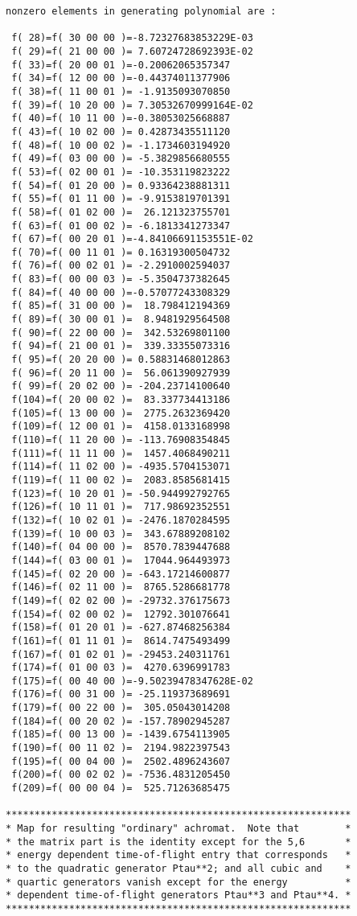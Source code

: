 \begin{footnotesize}
\begin{verbatim}
nonzero elements in generating polynomial are :

 f( 28)=f( 30 00 00 )=-8.72327683853229E-03
 f( 29)=f( 21 00 00 )= 7.60724728692393E-02
 f( 33)=f( 20 00 01 )=-0.20062065357347
 f( 34)=f( 12 00 00 )=-0.44374011377906
 f( 38)=f( 11 00 01 )= -1.9135093070850
 f( 39)=f( 10 20 00 )= 7.30532670999164E-02
 f( 40)=f( 10 11 00 )=-0.38053025668887
 f( 43)=f( 10 02 00 )= 0.42873435511120
 f( 48)=f( 10 00 02 )= -1.1734603194920
 f( 49)=f( 03 00 00 )= -5.3829856680555
 f( 53)=f( 02 00 01 )= -10.353119823222
 f( 54)=f( 01 20 00 )= 0.93364238881311
 f( 55)=f( 01 11 00 )= -9.9153819701391
 f( 58)=f( 01 02 00 )=  26.121323755701
 f( 63)=f( 01 00 02 )= -6.1813341273347
 f( 67)=f( 00 20 01 )=-4.84106691153551E-02
 f( 70)=f( 00 11 01 )= 0.16319300504732
 f( 76)=f( 00 02 01 )= -2.2910002594037
 f( 83)=f( 00 00 03 )= -5.3504737382645
 f( 84)=f( 40 00 00 )=-0.57077243308329
 f( 85)=f( 31 00 00 )=  18.798412194369
 f( 89)=f( 30 00 01 )=  8.9481929564508
 f( 90)=f( 22 00 00 )=  342.53269801100
 f( 94)=f( 21 00 01 )=  339.33355073316
 f( 95)=f( 20 20 00 )= 0.58831468012863
 f( 96)=f( 20 11 00 )=  56.061390927939
 f( 99)=f( 20 02 00 )= -204.23714100640
 f(104)=f( 20 00 02 )=  83.337734413186
 f(105)=f( 13 00 00 )=  2775.2632369420
 f(109)=f( 12 00 01 )=  4158.0133168998
 f(110)=f( 11 20 00 )= -113.76908354845
 f(111)=f( 11 11 00 )=  1457.4068490211
 f(114)=f( 11 02 00 )= -4935.5704153071
 f(119)=f( 11 00 02 )=  2083.8585681415
 f(123)=f( 10 20 01 )= -50.944992792765
 f(126)=f( 10 11 01 )=  717.98692352551
 f(132)=f( 10 02 01 )= -2476.1870284595
 f(139)=f( 10 00 03 )=  343.67889208102
 f(140)=f( 04 00 00 )=  8570.7839447688
 f(144)=f( 03 00 01 )=  17044.964493973
 f(145)=f( 02 20 00 )= -643.17214600877
 f(146)=f( 02 11 00 )=  8765.5286681778
 f(149)=f( 02 02 00 )= -29732.376175673
 f(154)=f( 02 00 02 )=  12792.301076641
 f(158)=f( 01 20 01 )= -627.87468256384
 f(161)=f( 01 11 01 )=  8614.7475493499
 f(167)=f( 01 02 01 )= -29453.240311761
 f(174)=f( 01 00 03 )=  4270.6396991783
 f(175)=f( 00 40 00 )=-9.50239478347628E-02
 f(176)=f( 00 31 00 )= -25.119373689691
 f(179)=f( 00 22 00 )=  305.05043014208
 f(184)=f( 00 20 02 )= -157.78902945287
 f(185)=f( 00 13 00 )= -1439.6754113905
 f(190)=f( 00 11 02 )=  2194.9822397543
 f(195)=f( 00 04 00 )=  2502.4896243607
 f(200)=f( 00 02 02 )= -7536.4831205450
 f(209)=f( 00 00 04 )=  525.71263685475

************************************************************
* Map for resulting "ordinary" achromat.  Note that        *
* the matrix part is the identity except for the 5,6       *
* energy dependent time-of-flight entry that corresponds   *
* to the quadratic generator Ptau**2; and all cubic and    *
* quartic generators vanish except for the energy          *
* dependent time-of-flight generators Ptau**3 and Ptau**4. *
************************************************************


\end{verbatim}
\end{footnotesize}
